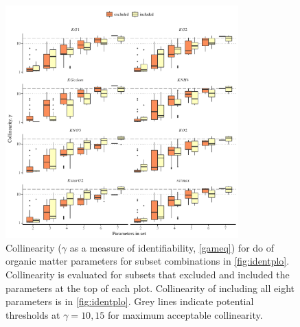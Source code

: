 \documentclass[preprint]{elsarticle}\usepackage[]{graphicx}\usepackage[]{color}
\begin{document}
\begin{figure}[!ht]

{\centering \includegraphics[width=0.8\textwidth]{figs/exclex-1} 

}

\caption{Collinearity ($\gamma$ as a measure of identifiability, \cref{gameq}) for \ac{do} of organic matter parameters for subset combinations in \cref{fig:identplo}.  Collinearity is evaluated for subsets that excluded and included the parameters at the top of each plot. Collinearity of including all eight parameters is in \cref{fig:identplo}. Grey lines indicate potential thresholds at $\gamma = 10, 15$ for maximum acceptable collinearity.}\label{fig:exclex}
\end{figure}
\end{document}
